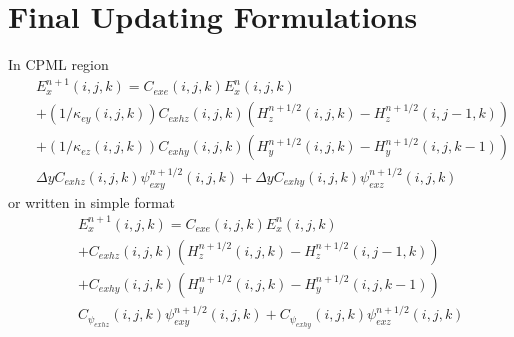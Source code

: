 \documentclass[a4paper,10pt]{article}
\begin{document}
\section{Final Updating Formulations}
In CPML region
\begin{eqnarray}
&&E^{n+1}_x(i,j,k)=C_{exe}(i,j,k)E^n_x(i,j,k)\nonumber\\
&&+(1/\kappa_{ey}(i,j,k))C_{exhz}(i,j,k)\left(H^{n+1/2}_{z}(i,j,k)-H^{n+1/2}_{z}(i,j-1,k)\right)\nonumber\\
&&+(1/\kappa_{ez}(i,j,k))C_{exhy}(i,j,k)\left(H^{n+1/2}_{y}(i,j,k)-H^{n+1/2}_{y}(i,j,k-1)\right)\nonumber\\
&&\Delta y C_{exhz}(i,j,k)\psi^{n+1/2}_{exy}(i,j,k)+\Delta y C_{exhy}(i,j,k)\psi^{n+1/2}_{exz}(i,j,k)
\end{eqnarray}
or written in simple format
\begin{eqnarray}
&&E^{n+1}_x(i,j,k)=C_{exe}(i,j,k)E^n_x(i,j,k)\nonumber\\
&&+C_{exhz}(i,j,k)\left(H^{n+1/2}_{z}(i,j,k)-H^{n+1/2}_{z}(i,j-1,k)\right)\nonumber\\
&&+C_{exhy}(i,j,k)\left(H^{n+1/2}_{y}(i,j,k)-H^{n+1/2}_{y}(i,j,k-1)\right)\nonumber\\
&&C_{\psi_{exhz}}(i,j,k)\psi^{n+1/2}_{exy}(i,j,k)+C_{\psi_{exhy}}(i,j,k)\psi^{n+1/2}_{exz}(i,j,k)
\end{eqnarray}
\end{document}
